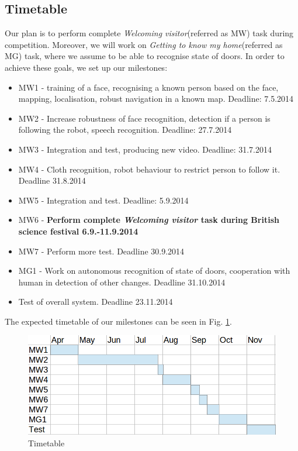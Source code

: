 \documentclass[conference]{IEEEtran}
\begin{document}
\subsection{Timetable}

Our plan is to perform complete \textit{Welcoming visitor}(referred as MW) task during competition. Moreover, we will work on \textit{Getting to know my home}(referred as MG) task, where we assume to be able to recognise state of doors. In order to achieve these goals, we set up our milestones:
\begin{itemize}
\item MW1 - training of a face, recognising a known person based on the face, mapping, localisation, robust navigation in a known map. Deadline: 7.5.2014
\item MW2 - Increase robustness of face recognition, detection if a person is following the robot, speech recognition. Deadline: 27.7.2014
\item MW3 - Integration and test, producing new video. Deadline: 31.7.2014
\item MW4 - Cloth recognition, robot behaviour to restrict person to follow it. Deadline 31.8.2014
\item MW5 - Integration and test. Deadline: 5.9.2014
\item MW6 - \textbf{Perform complete \textit{Welcoming visitor} task during British science festival 6.9.-11.9.2014}
\item MW7 - Perform more test. Deadline 30.9.2014
\item MG1 - Work on autonomous recognition of state of doors, cooperation with human in detection of other changes. Deadline 31.10.2014
\item Test of overall system. Deadline 23.11.2014
\end{itemize}
The expected timetable of our milestones can be seen in Fig. \ref{fig:plan}.

\begin{figure}[!htb]
\centering
\includegraphics[width=3.in]{timetable.png}
\caption{Timetable}
\label{fig:plan}
\end{figure}
\end{document}
